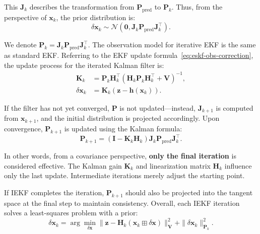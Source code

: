 This \(\mathbf{J}_k\) describes the transformation from \(\mathbf{P}_{\mathrm{pred}}\) to \(\mathbf{P}_k\). Thus, from the perspective of \(\mathbf{x}_{k}\), the prior distribution is:  
\begin{equation}\label{key}  
	\delta \mathbf{x}_k \sim \mathcal{N}(\mathbf{0}, \mathbf{J}_k \mathbf{P}_{\mathrm{pred}} \mathbf{J}_k^\top).  
\end{equation}  

We denote \(\mathbf{P}_k = \mathbf{J}_k \mathbf{P}_{\mathrm{pred}} \mathbf{J}_k^\top\). The observation model for iterative EKF is the same as standard EKF. Referring to the EKF update formula~\eqref{eq:eskf-obs-correction}, the update process for the iterated Kalman filter is:  
\begin{subequations}\label{eq:ieskf-obs-correction}  
	\begin{align}  
		\mathbf{K}_k &= \mathbf{P}_{k} \mathbf{H}_k^\top(\mathbf{H}_k \mathbf{P}_{k}   
		\mathbf{H}_k^\top + \mathbf{V})^{-1} ,\\  
		\delta \mathbf{x}_k &= \mathbf{K}_k (\mathbf{z} - \mathbf{h}(\mathbf{x}_k)).  
	\end{align}  
\end{subequations}  

If the filter has not yet converged, \(\mathbf{P}\) is not updated—instead, \(\mathbf{J}_{k+1}\) is computed from \(\mathbf{x}_{k+1}\), and the initial distribution is projected accordingly. Upon convergence, \(\mathbf{P}_{k+1}\) is updated using the Kalman formula:  
\begin{equation}\label{eq:update-of-iekf}  
	\mathbf{P}_{k+1} = (\mathbf{I} - \mathbf{K}_k \mathbf{H}_k)\mathbf{J}_k \mathbf{P}_{\mathrm{pred}} \mathbf{J}_k^\top.  
\end{equation}  

In other words, from a covariance perspective, \textbf{only the final iteration} is considered effective. The Kalman gain \(\mathbf{K}_k\) and linearization matrix \(\mathbf{H}_k\) influence only the last update. Intermediate iterations merely adjust the starting point.  

If IEKF completes the iteration, \(\mathbf{P}_{k+1}\) should also be projected into the tangent space at the final step to maintain consistency. Overall, each IEKF iteration solves a least-squares problem with a prior:  
\begin{equation}\label{key}  
	\delta \mathbf{x}_k = \arg \min\limits_{\delta \mathbf{x}} \| \mathbf{z} - \mathbf{H}_k(\mathbf{x}_k \boxplus \delta \mathbf{x}) \|_{\mathbf{V}}^2 + \| \delta \mathbf{x}_k \|_{\mathbf{P}_k}^2.  
\end{equation}  

